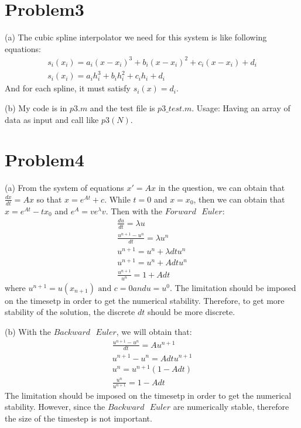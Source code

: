 \documentclass[11pt]{article}
\begin{document}
	\section{Problem3}
	\par (a) The cubic spline interpolator we need for this system is like following equations:
	\begin{equation}\begin{split}
		s_i(x_i) = a_i(x - x_i)^3 + b_i(x-x_i)^2 + c_i(x - x_i) + d_i \\
		s_i(x_i) = a_ih_i^3 + b_ih_i^2 + c_ih_i + d_i
	\end{split}\end{equation}
	And for each spline, it must satisfy $s_i(x) = d_i$.
	\par (b) My code is in $p3.m$ and the test file is $p3\mbox{\_}test.m$. Usage: Having an array of data as input and call like $p3(N)$.
	\section{Problem4}
	\par (a) From the system of equations $x' = Ax$ in the question, we can obtain that $\frac{dx}{dt} = Ax$ so that $x = e^{At} + c$. While $t = 0$ and $x = x_0$, then we can obtain that $x = e^{At} - tx_0$ and $e^A = ve^{\lambda}v$. Then with the $Forward \mbox{ } Euler$:
	\begin{eqnarray}
		\frac{du}{dt} = \lambda u\\
		\frac{u^{n+1} - u^n}{dt} = \lambda u^n\\
		u^{n+1} = u^n + \lambda dtu^n\\
		u^{n+1} = u^n + Adtu^n\\
		\frac{u^{n+1}}{u^n} = 1 + Adt
	\end{eqnarray} 
	where $u^{n+1} = u(x_{n+1}) \mbox{ and } c = 0 and u = u^0$. The limitation should be imposed on the timesetp in order to get the numerical stability. Therefore, to get more stability of the solution, the discrete $dt$ should be more discrete.
	\par (b) With the $Backward \mbox{ }Euler$, we will obtain that:
	\begin{eqnarray}
		\frac{u^{n+1} - u^n}{dt} = Au^{n+1} \\
		u^{n+1} - u^n =  Adtu^{n+1} \\
		u^n = u^{n+1}(1 - Adt) \\
		\frac{u^n}{u^{n+1}} = 1 - Adt
	\end{eqnarray}
	The limitation should be imposed on the timesetp in order to get the numerical stability. However, since the $Backward \mbox{ }Euler$ are numerically stable, therefore the size of the timestep is not important.
	
\end{document}
